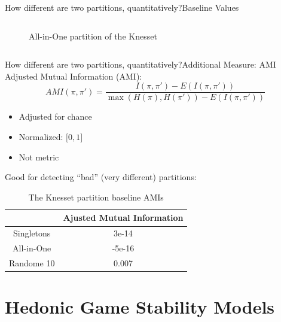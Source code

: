 \documentclass[xcolor=dvipsnames]{beamer}
\newcommand{\AMI}{\mathit{AMI}}
\begin{document}
\begin{frame}{How different are two partitions, quantitatively?}{Baseline Values}
\begin{columns}
\begin{figure}
    \caption{All-in-One partition of the Knesset}
  \end{figure}
  \end{columns}
\end{frame}

\begin{frame}{How different are two partitions, quantitatively?}{Additional Measure: AMI}
  Adjusted Mutual Information (AMI):
  \[
    \AMI(\pi, \pi') = \frac{I(\pi, \pi') - E(I(\pi, \pi'))}{\max(H(\pi), H(\pi')) - E(I(\pi, \pi'))}
  \]
  \begin{itemize}
    \item Adjusted for chance
    \item Normalized: $\lbrack0, 1\rbrack$
    \item Not metric
  \end{itemize}

  Good for detecting ``bad'' (very different) partitions:
  \begin{table}[h]
  \centering
  \begin{tabular}{|c|c|}
  \hline
         & Ajusted Mutual Information \\ \hline
  Singletons & 3e-14 \\
  All-in-One & -5e-16 \\
  Randome 10 & 0.007 \\
  \hline
  \end{tabular}
  \caption{The Knesset partition baseline AMIs}
  \end{table}
\end{frame}


\section{Hedonic Game Stability Models}
\end{document}
